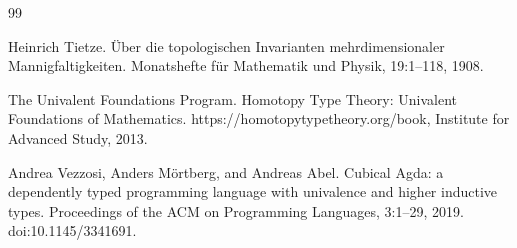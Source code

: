 \documentclass[10pt,a4paper]{amsart}
\begin{document}
\begin{thebibliography}{99}
\par\noindent  [18]  Heinrich Tietze.  Über die topologischen Invarianten mehrdimensionaler Mannigfaltigkeiten.  Monatshefte für Mathematik und Physik, 19:1–118, 1908.  
 
\par\noindent  [19]  The Univalent Foundations Program.  Homotopy Type Theory: Univalent Foundations of Mathematics.  https://homotopytypetheory.org/book, Institute for Advanced Study, 2013.  
 
\par\noindent  [20]  Andrea Vezzosi, Anders Mörtberg, and Andreas Abel.  Cubical Agda: a dependently typed programming language with univalence and higher inductive types.  Proceedings of the ACM on Programming Languages, 3:1–29, 2019.  doi:10.1145/3341691.  
  
\end{thebibliography}
\end{document}
